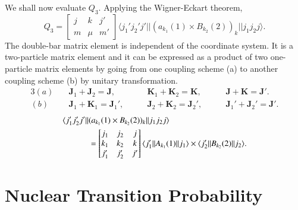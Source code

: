 We shall now evaluate $Q_3$. Applying the Wigner-Eckart theorem,
\begin{equation}
  Q_3 =
  \begin{bmatrix}    j & k & j'\\    m & \mu & m'  \end{bmatrix}
  \langle j_1' j_2' j' || (a_{k_1}(1) \times B_{k_2}(2))_k || j_1 j_2 j \rangle. \label{chap3-eq22}
\end{equation}
The double-bar matrix element is independent of the coordinate system. It is a two-particle matrix element and it can be expressed as a product of two one-particle matrix elements by going from one coupling scheme (a) to another coupling scheme (b) by unitary transformation.
\begin{alignat*}{3}
  (a) \quad&  {\boldsymbol  J}_1 + {\boldsymbol  J}_2 = {\boldsymbol  J}, \qquad &{\boldsymbol  K}_1+ {\boldsymbol  K}_2= {\boldsymbol  K}, \qquad &{\boldsymbol  J} + {\boldsymbol  K}= {\boldsymbol  J}'.\\
  (b) \quad &{\boldsymbol  J}_1 + {\boldsymbol  K}_1 = {\boldsymbol  J}_1', \qquad &{\boldsymbol  J}_2+{\boldsymbol  K}_2= {\boldsymbol  J}_2', \qquad & {\boldsymbol  J}_1'+{\boldsymbol  J}_2'={\boldsymbol  J}'.
\end{alignat*}
\begin{align}
  \langle j_1' j_2' j' || & (a_{k_1}(1) \times B_{k_2}(2))_k ||  j_1 j_2 j \rangle \notag \\
  & =  \begin{bmatrix} j_1 & j_2 & j\\ k_1 & k_2 & k \\ j_1' & j_2' & j'  \end{bmatrix}
  \langle j_1' || A_{k_1}(1)|| j_1 \rangle \times \langle j_2' || B_{k_2} (2)|| j_2 \rangle . \label{chap3-eq23}
\end{align}

\section{Nuclear Transition Probability}\label{chap3-sec3}

